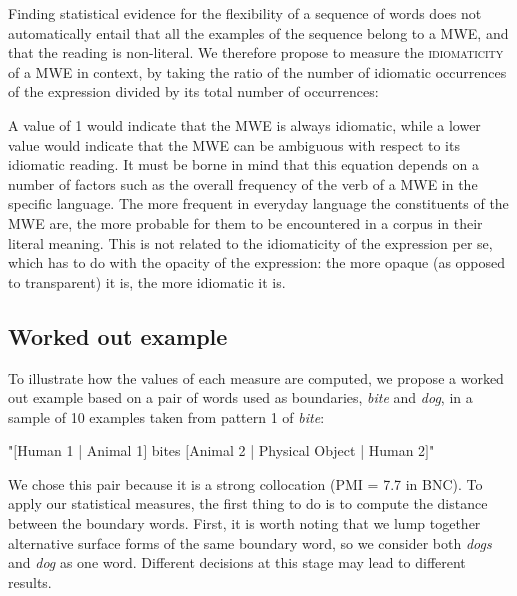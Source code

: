\documentclass[output=paper]{langsci/langscibook}
\begin{document}
Finding statistical evidence for the flexibility of a sequence of words
does not automatically entail that all the examples of the sequence
belong to a MWE, and that the reading is non-literal. We therefore
propose to measure the  \textsc{idiomaticity} of a MWE in
context, by taking the ratio of the number of idiomatic occurrences of
the expression divided by its total number of occurrences:




A value of 1 would indicate that the MWE is always idiomatic, while a
lower value would indicate that the MWE can be ambiguous with respect
to its idiomatic reading. It must be borne in mind that this equation
depends on a number of factors such as the overall frequency of the
verb of a MWE in the specific language. The more frequent in everyday
language the constituents of the MWE are, the more probable for them to
be encountered in a corpus in their literal meaning. This is not
related to the idiomaticity of the expression per se, which has to do
with the opacity of the expression: the more opaque (as opposed to
transparent) it is, the more idiomatic it is.


\subsection{Worked out example}

To illustrate how the values of each measure are computed, we propose a
worked out example based on a pair of words used as boundaries, \textit{bite}
and \textit{dog}, in a sample of 10 examples taken from pattern 1 of \textit{bite}:


\ea
"$[$Human 1 | Animal 1$]$ bites $[$Animal 2 | Physical Object | Human 2$]$"
\z


We chose this pair because it is a strong collocation (PMI = 7.7 in
BNC). To apply our statistical measures, the first thing to do is to
compute the distance between the boundary words. First, it is worth
noting that we lump together alternative surface forms of the same
boundary word, so we consider both \textit{dogs} and \textit{dog} as one word.
Different decisions at this stage may lead to different results.
\end{document}
